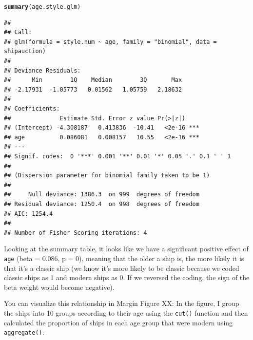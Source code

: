 \documentclass{tufte-book}\usepackage[]{graphicx}\usepackage[]{color}
\makeatletter
\newcommand{\hlnum}[1]{\textcolor[rgb]{0.686,0.059,0.569}{#1}}%
\newcommand{\hlstr}[1]{\textcolor[rgb]{0.192,0.494,0.8}{#1}}%
\newcommand{\hlopt}[1]{\textcolor[rgb]{0,0,0}{#1}}%
\newcommand{\hlstd}[1]{\textcolor[rgb]{0.345,0.345,0.345}{#1}}%
\newcommand{\hlkwb}[1]{\textcolor[rgb]{0.69,0.353,0.396}{#1}}%
\newcommand{\hlkwc}[1]{\textcolor[rgb]{0.333,0.667,0.333}{#1}}%
\newcommand{\hlkwd}[1]{\textcolor[rgb]{0.737,0.353,0.396}{\textbf{#1}}}%
\newenvironment{kframe}{%
 \def\at@end@of@kframe{}%
 \ifinner\ifhmode%
  \def\at@end@of@kframe{\end{minipage}}%
  \begin{minipage}{\columnwidth}%
 \fi\fi%
 \def\FrameCommand##1{\hskip\@totalleftmargin \hskip-\fboxsep
 \colorbox{shadecolor}{##1}\hskip-\fboxsep
     \hskip-\linewidth \hskip-\@totalleftmargin \hskip\columnwidth}%
 \MakeFramed {\advance\hsize-\width
   \@totalleftmargin\z@ \linewidth\hsize
   \@setminipage}}%
 {\par\unskip\endMakeFramed%
 \at@end@of@kframe}
\newenvironment{knitrout}{}{} %
\makeatother
\begin{document}
\begin{footnotesize}
\begin{footnotesize}
\begin{knitrout}
\begin{kframe}
\begin{alltt}
\hlkwd{summary}\hlstd{(age.style.glm)}
\end{alltt}
\begin{verbatim}
## 
## Call:
## glm(formula = style.num ~ age, family = "binomial", data = shipauction)
## 
## Deviance Residuals: 
##      Min        1Q    Median        3Q       Max  
## -2.17931  -1.05773   0.01562   1.05759   2.18632  
## 
## Coefficients:
##              Estimate Std. Error z value Pr(>|z|)    
## (Intercept) -4.308187   0.413836  -10.41   <2e-16 ***
## age          0.086081   0.008157   10.55   <2e-16 ***
## ---
## Signif. codes:  0 '***' 0.001 '**' 0.01 '*' 0.05 '.' 0.1 ' ' 1
## 
## (Dispersion parameter for binomial family taken to be 1)
## 
##     Null deviance: 1386.3  on 999  degrees of freedom
## Residual deviance: 1250.4  on 998  degrees of freedom
## AIC: 1254.4
## 
## Number of Fisher Scoring iterations: 4
\end{verbatim}
\end{kframe}
\end{knitrout}
\end{footnotesize}

Looking at the summary table, it looks like we have a significant positive effect of \texttt{age} (beta = 0.086, p = 0), meaning that the older a ship is, the more likely it is that it's a classic ship (we know it's more likely to be classic because we coded classic ships as 1 and modern ships as 0. If we reversed the coding, the sign of the beta weight would become negative).

You can visualize this relationship in Margin Figure XX: In the figure, I group the ships into 10 groups according to their age using the \texttt{cut()} function and then calculated the proportion of ships in each age group that were modern using \texttt{aggregate()}:

\begin{marginfigure}
\end{marginfigure}
\end{footnotesize}
\end{document}
